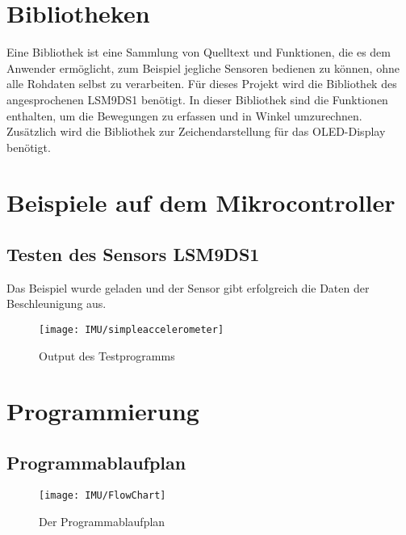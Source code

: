 %
%
%






\section{Bibliotheken}

Eine Bibliothek ist eine Sammlung von Quelltext und Funktionen, die es dem Anwender ermöglicht, zum Beispiel jegliche Sensoren bedienen zu können, ohne alle Rohdaten selbst zu verarbeiten. Für dieses Projekt wird die Bibliothek  des angesprochenen LSM9DS1 benötigt. In dieser Bibliothek sind die Funktionen enthalten, um die Bewegungen zu erfassen und in Winkel umzurechnen. Zusätzlich wird die Bibliothek   zur Zeichendarstellung für das OLED-Display benötigt. 





\section{Beispiele auf dem Mikrocontroller}


\subsection{Testen des  Sensors LSM9DS1}

Das Beispiel  wurde geladen und der Sensor gibt erfolgreich die Daten der Beschleunigung aus.

\begin{figure}[H]
    \centering
    \texttt{[image: IMU/simpleaccelerometer]}
    \caption{Output des Testprogramms}
\end{figure}



\section{Programmierung}

\subsection{Programmablaufplan}

\begin{figure}
    \centering
    \texttt{[image: IMU/FlowChart]}
    \caption{Der Programmablaufplan}
\end{figure}


